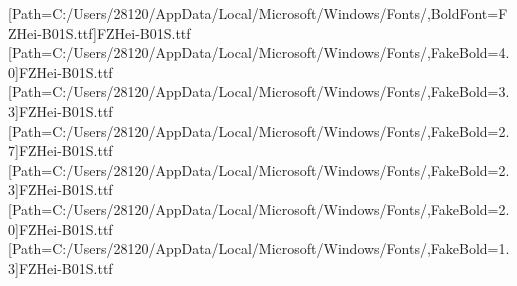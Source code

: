 \setmainfont{Times New Roman}
[Path=C:/Users/28120/AppData/Local/Microsoft/Windows/Fonts/,BoldFont=FZHei-B01S.ttf]{FZHei-B01S.ttf}
[Path=C:/Users/28120/AppData/Local/Microsoft/Windows/Fonts/,FakeBold=4.0]{FZHei-B01S.ttf}
[Path=C:/Users/28120/AppData/Local/Microsoft/Windows/Fonts/,FakeBold=3.3]{FZHei-B01S.ttf}
[Path=C:/Users/28120/AppData/Local/Microsoft/Windows/Fonts/,FakeBold=2.7]{FZHei-B01S.ttf}
[Path=C:/Users/28120/AppData/Local/Microsoft/Windows/Fonts/,FakeBold=2.3]{FZHei-B01S.ttf}
[Path=C:/Users/28120/AppData/Local/Microsoft/Windows/Fonts/,FakeBold=2.0]{FZHei-B01S.ttf}
[Path=C:/Users/28120/AppData/Local/Microsoft/Windows/Fonts/,FakeBold=1.3]{FZHei-B01S.ttf}
